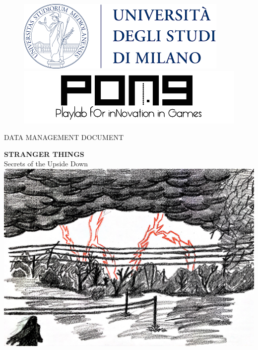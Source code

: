 \thispagestyle{empty}
{

	\begin{figure}
		\begin{minipage}{0.5\textwidth}
			\centering
			\includegraphics[width=0.6\linewidth]{images/frontespizio/unimi_logo.png}
		\end{minipage}\hfill
		\begin{minipage}{0.5\textwidth}
			\centering
			\includegraphics[width=0.6\linewidth]{images/frontespizio/pong_logo.png}
		\end{minipage}
	\end{figure}

	\vspace*{0.6cm}
	\begin{center}
		\Huge DATA MANAGEMENT DOCUMENT\\
	\end{center}
	
	\vspace{0.6cm}
	\begin{center}
		\Huge \textbf{STRANGER THINGS}\\
		\Huge {Secrets of the Upside Down}\\
		\vspace*{5mm}
		\includegraphics[width=15cm]{images/frontespizio/cover.jpg}
	\end{center}

}
